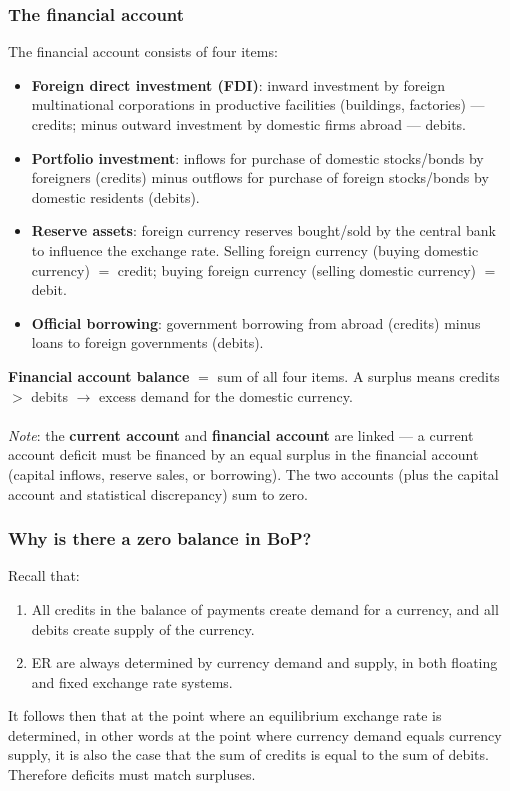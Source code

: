 \subsubsection*{The financial account}
The financial account consists of four items:
\begin{itemize}
  \item \textbf{Foreign direct investment (FDI)}: inward investment by foreign multinational corporations in productive facilities (buildings, factories) --- credits; minus outward investment by domestic firms abroad --- debits.
  \item \textbf{Portfolio investment}: inflows for purchase of domestic stocks/bonds by foreigners (credits) minus outflows for purchase of foreign stocks/bonds by domestic residents (debits).
  \item \textbf{Reserve assets}: foreign currency reserves bought/sold by the central bank to influence the exchange rate. Selling foreign currency (buying domestic currency) $=$ credit; buying foreign currency (selling domestic currency) $=$ debit.
  \item \textbf{Official borrowing}: government borrowing from abroad (credits) minus loans to foreign governments (debits).
\end{itemize}
\textbf{Financial account balance} $=$ sum of all four items. A surplus means credits $>$ debits $\to$ excess demand for the domestic currency.\\\\
\textit{Note}: the \textbf{current account} and \textbf{financial account} are linked --- a current account deficit must be financed by an equal surplus in the financial account (capital inflows, reserve sales, or borrowing). The two accounts (plus the capital account and statistical discrepancy) sum to zero.
\subsubsection*{Why is there a zero balance in BoP?}
Recall that:
\begin{enumerate}
  \item All credits in the balance of payments create demand for a currency, and all debits create supply of the currency.
  \item ER are always determined by currency demand and supply, in both floating and fixed exchange rate systems.
\end{enumerate}
It follows then that at the point where an equilibrium exchange rate is determined, in other words at the point where currency demand equals currency supply, it is also the case that the sum of credits is equal to the sum of debits. Therefore deficits must match surpluses.
